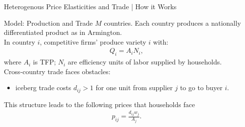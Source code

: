 \documentclass[9pt,pdftex,aspectratio=1610]{beamer}
\theoremstyle{definition}
\begin{document}
\begin{frame}[t]{Heterogenous Price Elasticities and Trade | How it Works}

\end{frame}


\begin{frame}[t]{Model: Production and Trade}
\smallskip
$M$ countries. Each country produces a nationally differentiated product as in Armington.\\
\bigskip
\medskip
In country $i$, competitive firms' produce variety $i$ with:
\begin{align*}
Q_i = A_i N_i,
\end{align*}
where $A_i$ is TFP; $N_i$ are efficiency units of labor supplied by households.\\
\bigskip
\medskip
Cross-country trade faces obstacles:
\begin{itemize}
\smallskip
\item iceberg trade costs $d_{ij} > 1$ for one unit from supplier $j$ to go to buyer $i$.
\end{itemize}
\bigskip
\medskip
This structure leads to the following prices that households face
\begin{align*}
p_{ij} = \frac{d_{ij}w_{j}}{A_{j}}.
\end{align*}
\end{frame}

\end{document}
